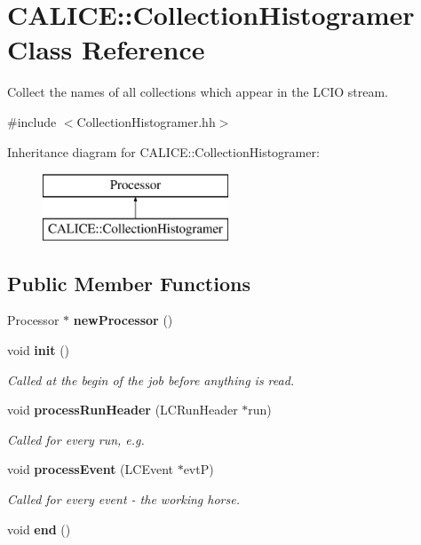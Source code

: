 \section{C\-A\-L\-I\-C\-E\-:\-:Collection\-Histogramer Class Reference}
\label{classCALICE_1_1CollectionHistogramer}


Collect the names of all collections which appear in the L\-C\-I\-O stream.  




{\ttfamily \#include $<$Collection\-Histogramer.\-hh$>$}

Inheritance diagram for C\-A\-L\-I\-C\-E\-:\-:Collection\-Histogramer\-:\begin{figure}[H]
\begin{center}
\leavevmode
\includegraphics[height=2.000000cm]{classCALICE_1_1CollectionHistogramer}
\end{center}
\end{figure}
\subsection*{Public Member Functions}
\begin{DoxyCompactItemize}
\item 
Processor $\ast$ {\bfseries new\-Processor} ()\label{classCALICE_1_1CollectionHistogramer_ab0f528c9dbae6df5c5daad1c4a79fdce}

\item 
void {\bf init} ()
\begin{DoxyCompactList}\small\item\em Called at the begin of the job before anything is read. \end{DoxyCompactList}\item 
void {\bf process\-Run\-Header} (L\-C\-Run\-Header $\ast$run)
\begin{DoxyCompactList}\small\item\em Called for every run, e.\-g. \end{DoxyCompactList}\item 
void {\bf process\-Event} (L\-C\-Event $\ast$evt\-P)\label{classCALICE_1_1CollectionHistogramer_a35914ac7c3eb21bcb71c09ca1ae011f5}

\begin{DoxyCompactList}\small\item\em Called for every event -\/ the working horse. \end{DoxyCompactList}\item 
void {\bfseries end} ()\label{classCALICE_1_1CollectionHistogramer_a59fc5c8e1e396b6bd4268549181b2035}

\end{DoxyCompactItemize}
